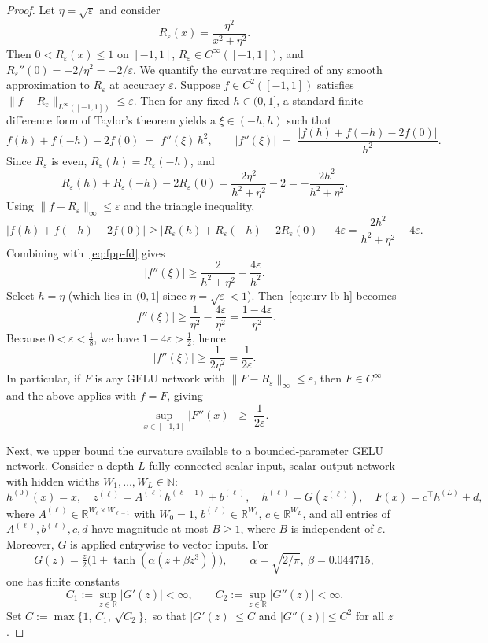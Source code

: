 \documentclass{article}
\theoremstyle{plain}
\theoremstyle{definition}
\theoremstyle{remark}
\begin{document}
\begin{proof}
 {Let $\eta=\sqrt{\varepsilon}$ and consider
\[
R_\varepsilon(x)=\frac{\eta^2}{x^2+\eta^2}.
\]
Then $0<R_\varepsilon(x)\le 1$ on $[-1,1]$, $R_\varepsilon\in C^\infty([-1,1])$, and $R_\varepsilon''(0)=-2/\eta^2=-2/\varepsilon$. We quantify the curvature required of any smooth approximation to $R_\varepsilon$ at accuracy $\varepsilon$. Suppose $f\in C^2([-1,1])$ satisfies $\|f-R_\varepsilon\|_{L^\infty([-1,1])}\le \varepsilon$. Then for any fixed $h\in(0,1]$, a standard finite-difference form of Taylor's theorem yields a $\xi\in(-h,h)$ such that}
\begin{equation}
f(h)+f(-h)-2f(0) \;=\; f''(\xi)\,h^2,\qquad |f''(\xi)| \;=\; \frac{|f(h)+f(-h)-2f(0)|}{h^2}.
\label{eq:fpp-fd}
\end{equation}
 {Since $R_\varepsilon$ is even, $R_\varepsilon(h)=R_\varepsilon(-h)$, and}
\[
R_\varepsilon(h)+R_\varepsilon(-h)-2R_\varepsilon(0)
=
\frac{2\eta^2}{h^2+\eta^2}-2
=
-\frac{2h^2}{h^2+\eta^2}.
\]
 {Using $\|f-R_\varepsilon\|_\infty\le \varepsilon$ and the triangle inequality,}
\[
|f(h)+f(-h)-2f(0)|
\ge |R_\varepsilon(h)+R_\varepsilon(-h)-2R_\varepsilon(0)|-4\varepsilon
=
\frac{2h^2}{h^2+\eta^2}-4\varepsilon.
\]
Combining with~\cref{eq:fpp-fd} gives
\begin{equation}
|f''(\xi)|
\ge \frac{2}{h^2+\eta^2}-\frac{4\varepsilon}{h^2}.
\label{eq:curv-lb-h}
\end{equation}
Select $h=\eta$ (which lies in $(0,1]$ since $\eta=\sqrt{\varepsilon}<1$). Then~\cref{eq:curv-lb-h} becomes
\[
|f''(\xi)|
\ge \frac{1}{\eta^2}-\frac{4\varepsilon}{\eta^2}
=
\frac{1-4\varepsilon}{\eta^2}.
\]
Because $0<\varepsilon<\tfrac18$, we have $1-4\varepsilon>\tfrac12$, hence
\[
|f''(\xi)|\ge \frac{1}{2\eta^2}=\frac{1}{2\varepsilon}.
\]
 {In particular, if $F$ is any GELU network with $\|F-R_\varepsilon\|_\infty\le \varepsilon$, then $F\in C^\infty$ and the above applies with $f=F$, giving}
\begin{equation}
\sup_{x\in[-1,1]} |F''(x)| \;\ge\; \frac{1}{2\varepsilon}.
\label{eq:need-curv}
\end{equation}

Next, we upper bound the curvature available to a bounded-parameter GELU network. Consider a depth-$L$ fully connected scalar-input, scalar-output network with hidden widths $W_1,\dots,W_L\in\mathbb N$:
\[
h^{(0)}(x)=x,\quad z^{(\ell)}=A^{(\ell)}h^{(\ell-1)}+b^{(\ell)},\quad h^{(\ell)}=G(z^{(\ell)}),\quad F(x)=c^\top h^{(L)}+d,
\]
where $A^{(\ell)}\in\mathbb R^{W_\ell\times W_{\ell-1}}$ with $W_0=1$, $b^{(\ell)}\in\mathbb R^{W_\ell}$, $c\in\mathbb R^{W_L}$, and all entries of $A^{(\ell)},b^{(\ell)},c,d$ have magnitude at most $B\ge1$, where $B$ is independent of $\varepsilon$. Moreover, $G$ is applied entrywise to vector inputs. For
\[
G(z)=\tfrac{z}{2}\bigl(1+\tanh(\alpha(z+\beta z^3))\bigr),\qquad \alpha=\sqrt{2/\pi},\ \beta=0.044715,
\]
one has finite constants
\[
C_1:=\sup_{z\in\mathbb R}|G'(z)|<\infty,\qquad C_2:=\sup_{z\in\mathbb R}|G''(z)|<\infty.
\]
Set \(
C:=\max\{1,\,C_1,\,\sqrt{C_2}\},
\) so that $|G'(z)|\le C$ and $|G''(z)|\le C^2$ for all $z$.


\end{proof}
\end{document}
